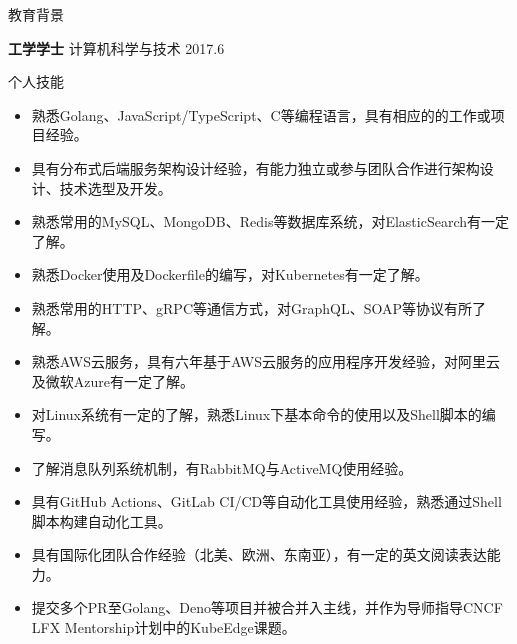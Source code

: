 \documentclass{resume} %
\begin{document}

\begin{rSection}{教育背景}

  {\bf 工学学士} 计算机科学与技术 \hfill {2017.6}

\end{rSection}

\begin{rSection}{个人技能}
  \begin{itemize}
    \itemsep -3pt {}
    \item 熟悉Golang、JavaScript/TypeScript、C等编程语言，具有相应的的工作或项目经验。
    \item 具有分布式后端服务架构设计经验，有能力独立或参与团队合作进行架构设计、技术选型及开发。
    \item 熟悉常用的MySQL、MongoDB、Redis等数据库系统，对ElasticSearch有一定了解。
    \item 熟悉Docker使用及Dockerfile的编写，对Kubernetes有一定了解。
    \item 熟悉常用的HTTP、gRPC等通信方式，对GraphQL、SOAP等协议有所了解。
    \item 熟悉AWS云服务，具有六年基于AWS云服务的应用程序开发经验，对阿里云及微软Azure有一定了解。
    \item 对Linux系统有一定的了解，熟悉Linux下基本命令的使用以及Shell脚本的编写。
    \item 了解消息队列系统机制，有RabbitMQ与ActiveMQ使用经验。
    \item 具有GitHub Actions、GitLab CI/CD等自动化工具使用经验，熟悉通过Shell脚本构建自动化工具。
    \item 具有国际化团队合作经验（北美、欧洲、东南亚），有一定的英文阅读表达能力。
    \item 提交多个PR至Golang、Deno等项目并被合并入主线，并作为导师指导CNCF LFX Mentorship计划中的KubeEdge课题。
  \end{itemize}
\end{rSection}
\end{document}
